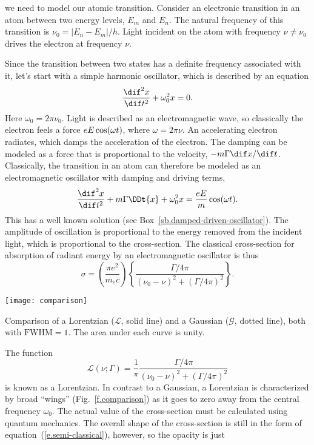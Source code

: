  we need to model our atomic transition. Consider an electronic transition in an atom between two energy levels, $E_m$ and $E_n$. The natural frequency of this transition is $\nu_0 = |E_n-E_m|/h$. Light incident on the atom with frequency $\nu\neq\nu_0$ drives the electron at frequency $\nu$. 

Since the transition between two states has a definite frequency associated with it, let's start with a simple harmonic oscillator, which is described by an equation
\[
	\DDtt{x} + \omega_{0}^{2} x = 0.
\]
Here $\omega_{0} = 2\pi\nu_{0}$. Light is described as an electromagnetic wave, so classically the electron feels a force $eE\cos(\omega t)$, where $\omega = 2\pi \nu$. An accelerating electron radiates, which damps the acceleration of the electron. The damping can be modeled as a force that is proportional to the velocity, $-m\Gamma \dif x/\dif t$. Classically, the transition in an atom can therefore be modeled as an electromagnetic oscillator with damping and driving terms,
\[
	\DDtt{x} + m\Gamma\DDt{x} + \omega_{0}^{2}x = \frac{eE}{m}\cos(\wt).
\]
This has a well known solution (see Box~\ref{sb.damped-driven-oscillator}). The amplitude of oscillation is proportional to the energy removed from the incident light, which is proportional to the cross-section. The classical cross-section for absorption of radiant energy by an electromagnetic oscillator is thus
\begin{equation}\label{e.semi-classical}
    \sigma = \left(\frac{\pi e^2}{m_e c}\right)
    \left\{\frac{\Gamma/4\pi}{(\nu_0-\nu)^2 + (\Gamma/4\pi)^2}\right\}.
\end{equation}
\begin{marginfigure}
\texttt{[image: comparison]}
\caption[Comparison of Lorentzian and Gaussian distributions]{\label{f.comparison}
Comparison of a Lorentzian ($\mathcal{L}$, solid line) and a Gaussian ($\mathcal{G}$, dotted line), both with $\mathrm{FWHM}=1$. The area under each curve is unity.}
\end{marginfigure}
The function
\[
    \mathcal{L}(\nu;\Gamma) = \frac{1}{\pi} 
        \frac{\Gamma/4\pi}{(\nu_0-\nu)^2 + (\Gamma/4\pi)^2}
\]
is known as a Lorentzian.  In contrast to a Gaussian, a Lorentzian is characterized by broad ``wings'' (Fig.~\ref{f.comparison}) as it goes to zero away from the central frequency $\omega_{0}$.
The actual value of the cross-section must be calculated using quantum mechanics. The overall shape of the cross-section is still in the form of equation~(\ref{e.semi-classical}), however, so the opacity is just
